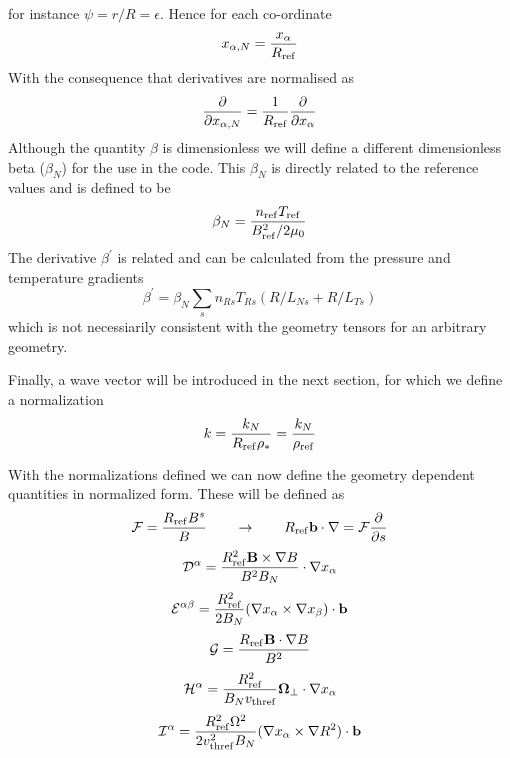 \documentclass{report}
\def\be{\begin{equation}}
\def\ee{\end{equation}}
\begin{document}
for instance $\psi = r / R = \epsilon$. Hence for each co-ordinate
\be
x_{\alpha,N} = {x_{\alpha} \over R_{\rm ref}}
\ee
With the consequence that derivatives are normalised as
\be
{\partial \over \partial x_{\alpha,N}} = {1 \over R_{\rm ref}} {\partial \over \partial x_\alpha}
\ee
Although the quantity $\beta$ is
dimensionless we will define a different dimensionless beta ($\beta_N$) for the 
use in the code. This $\beta_N$ is directly related to the reference values and is
defined to be 
\be 
\beta_N = {n_{\rm ref} T_{\rm ref} \over B_{\rm ref}^2 / 2 \mu_0} 
\ee
The derivative $\beta^\prime$ is related and can be calculated from the pressure and temperature gradients
\be
\beta^\prime=\beta_N \sum_s n_{Rs} T_{Rs} (R/L_{Ns} + R/L_{Ts})
\ee
which is not necessiarily consistent with the geometry tensors for an arbitrary geometry.

Finally, a wave vector will be introduced in the next section, for which we define 
a normalization 
\be 
\label{knorm}
k = {k_N \over R_{\rm ref} \rho_*} = {k_N \over \rho_{\rm ref}}
\ee 

With the normalizations defined we can now define the geometry dependent quantities
in normalized form. These will be defined as 
\be 
{\cal F} = {R_{\rm ref} B^s \over B} \qquad \rightarrow \qquad 
R_{\rm ref} {\bf b} \cdot \nabla  = {{\cal F}} {\partial \over \partial s} 
\ee
\be 
{\cal D}^\alpha = {R_{\rm ref}^2 {\bf B} \times \nabla B \over B^2 B_N} \cdot \nabla x_\alpha 
\ee 
\be 
\label{efun}
{\cal E}^{\alpha \beta} = {R_{\rm ref}^2\over 2 B_N} (\nabla x_\alpha \times \nabla x_\beta) \cdot {\bf b} 
\ee 
\be 
{\cal G} = {R_{\rm ref} {\bf B } \cdot \nabla B \over B^2} 
\ee
\be 
{\cal H}^\alpha = {R_{\rm ref}^2 \over B_N v_{\rm thref}}{\bf \Omega}_\perp \cdot \nabla x_\alpha 
\ee
\be 
{\cal I}^\alpha = {R_{\rm ref}^2 \Omega^2 \over 2 v_{\rm thref}^2 B_N } (\nabla x_\alpha \times \nabla R^2) 
\cdot {\bf b} 
\ee
\end{document}
